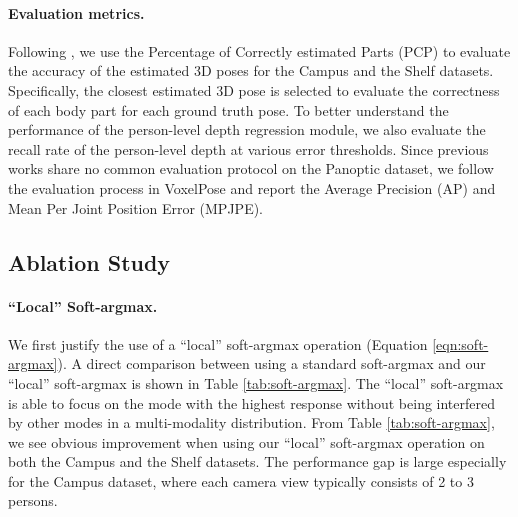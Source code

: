 \documentclass[final]{cvpr}
\begin{document}
\vspace{-3mm} \paragraph{Evaluation metrics.}
Following \cite{dong2019fast,huang2020end,tu2020voxelpose}, we use the Percentage of Correctly estimated Parts (PCP) to evaluate the accuracy of the estimated 3D poses for the Campus and the Shelf datasets.
Specifically, the closest estimated 3D pose is selected to evaluate the correctness of each body part for each ground truth pose.
To better understand the performance of the person-level depth regression module, we also evaluate the recall rate of the person-level depth at various error thresholds.
Since previous works share no common evaluation protocol on the Panoptic dataset, we follow the evaluation process in VoxelPose \cite{tu2020voxelpose} and report the Average Precision (AP) and Mean Per Joint Position Error (MPJPE).

\vspace{+3mm}
\subsection{Ablation Study}

\paragraph{``Local'' Soft-argmax.}
We first justify the use of a ``local'' soft-argmax operation (\cf Equation \ref{eqn:soft-argmax}).
A direct comparison between using a standard soft-argmax and our ``local'' soft-argmax is shown in Table \ref{tab:soft-argmax}.
The ``local'' soft-argmax is able to focus on the mode with the highest response without being interfered by other modes in a multi-modality distribution.
From Table \ref{tab:soft-argmax}, we see obvious improvement when using our ``local'' soft-argmax operation on both the Campus and the Shelf datasets.
The performance gap is large especially for the Campus dataset, where each camera view typically consists of 2 to 3 persons.
\end{document}
